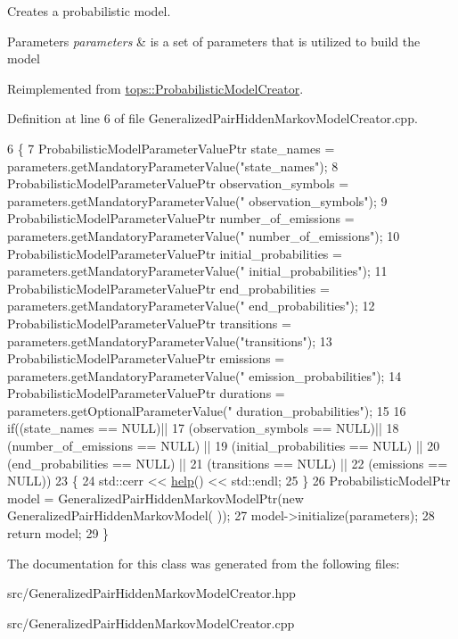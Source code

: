 Creates a probabilistic model. 


\begin{DoxyParams}{Parameters}
{\em parameters} & is a set of parameters that is utilized to build the model \\
\hline
\end{DoxyParams}


Reimplemented from \hyperlink{classtops_1_1ProbabilisticModelCreator_afed6c8ffa45fff446bdaa8b533da8f7c}{tops\+::\+Probabilistic\+Model\+Creator}.



Definition at line 6 of file Generalized\+Pair\+Hidden\+Markov\+Model\+Creator.\+cpp.


\begin{DoxyCode}
6                                                                                                            
                  \{
7     ProbabilisticModelParameterValuePtr state\_names = parameters.getMandatoryParameterValue(\textcolor{stringliteral}{"state\_names"});
8     ProbabilisticModelParameterValuePtr observation\_symbols = parameters.getMandatoryParameterValue(\textcolor{stringliteral}{"
      observation\_symbols"});
9     ProbabilisticModelParameterValuePtr number\_of\_emissions = parameters.getMandatoryParameterValue(\textcolor{stringliteral}{"
      number\_of\_emissions"});
10     ProbabilisticModelParameterValuePtr initial\_probabilities = parameters.getMandatoryParameterValue(\textcolor{stringliteral}{"
      initial\_probabilities"});   
11     ProbabilisticModelParameterValuePtr end\_probabilities = parameters.getMandatoryParameterValue(\textcolor{stringliteral}{"
      end\_probabilities"});   
12     ProbabilisticModelParameterValuePtr transitions = parameters.getMandatoryParameterValue(\textcolor{stringliteral}{"transitions"});
13     ProbabilisticModelParameterValuePtr emissions = parameters.getMandatoryParameterValue(\textcolor{stringliteral}{"
      emission\_probabilities"});
14     ProbabilisticModelParameterValuePtr durations = parameters.getOptionalParameterValue(\textcolor{stringliteral}{"
      duration\_probabilities"});
15 
16     \textcolor{keywordflow}{if}((state\_names == NULL)||
17        (observation\_symbols == NULL)||
18        (number\_of\_emissions == NULL) || 
19        (initial\_probabilities == NULL) || 
20        (end\_probabilities == NULL) || 
21        (transitions == NULL) || 
22        (emissions == NULL)) 
23       \{
24     std::cerr << \hyperlink{classtops_1_1GeneralizedPairHiddenMarkovModelCreator_a51574d0c38fdf8b8fd2d703b4481b861}{help}() << std::endl;
25       \}
26     ProbabilisticModelPtr model = GeneralizedPairHiddenMarkovModelPtr(\textcolor{keyword}{new} GeneralizedPairHiddenMarkovModel(
      ));
27     model->initialize(parameters);
28     \textcolor{keywordflow}{return} model;
29   \}
\end{DoxyCode}


The documentation for this class was generated from the following files\+:\begin{DoxyCompactItemize}
\item 
src/Generalized\+Pair\+Hidden\+Markov\+Model\+Creator.\+hpp\item 
src/Generalized\+Pair\+Hidden\+Markov\+Model\+Creator.\+cpp\end{DoxyCompactItemize}
